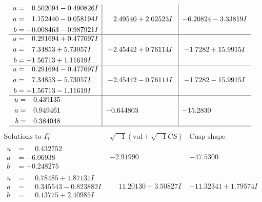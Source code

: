 \documentclass[1p]{elsarticle_modified}
\theoremstyle{definition}
\newcommand{\I}{\sqrt{-1}}
\begin{document}
$$\begin{array}{c|c|c}
\begin{aligned}
u &= \phantom{-}0.502094 - 0.490826 I \\
a &= \phantom{-}1.152440 - 0.058194 I \\
b &= -0.008463 - 0.987921 I\end{aligned}
 & \phantom{-}2.49540 + 2.02523 I & -6.20824 - 3.33819 I \\ \hline\begin{aligned}
u &= \phantom{-}0.291694 + 0.477697 I \\
a &= \phantom{-}7.34853 + 5.73057 I \\
b &= -1.56713 + 1.11619 I\end{aligned}
 & -2.45442 + 0.76114 I & -1.7282 + 15.9915 I \\ \hline\begin{aligned}
u &= \phantom{-}0.291694 - 0.477697 I \\
a &= \phantom{-}7.34853 - 5.73057 I \\
b &= -1.56713 - 1.11619 I\end{aligned}
 & -2.45442 - 0.76114 I & -1.7282 - 15.9915 I \\ \hline\begin{aligned}
u &= -0.439135\phantom{ +0.000000I} \\
a &= \phantom{-}0.949461\phantom{ +0.000000I} \\
b &= \phantom{-}0.384048\phantom{ +0.000000I}\end{aligned}
 & -0.644803\phantom{ +0.000000I} & -15.2830\phantom{ +0.000000I}\\
 \hline 
 \end{array}$$\newpage$$\begin{array}{c|c|c}  
\text{Solutions to }I^u_{1}& \I (\text{vol} + \sqrt{-1}CS) & \text{Cusp shape}\\
 \hline 
\begin{aligned}
u &= \phantom{-}0.432752\phantom{ +0.000000I} \\
a &= -6.06938\phantom{ +0.000000I} \\
b &= -0.248275\phantom{ +0.000000I}\end{aligned}
 & -2.91990\phantom{ +0.000000I} & -47.5300\phantom{ +0.000000I} \\ \hline\begin{aligned}
u &= \phantom{-}0.78485 + 1.87131 I \\
a &= \phantom{-}0.345543 - 0.823882 I \\
b &= \phantom{-}0.13775 + 2.40985 I\end{aligned}
 & \phantom{-}11.20130 - 3.50827 I & -11.32341 + 1.79574 I \\ \hline\begin{aligned}

\end{aligned}
\end{array}$$
\end{document}
